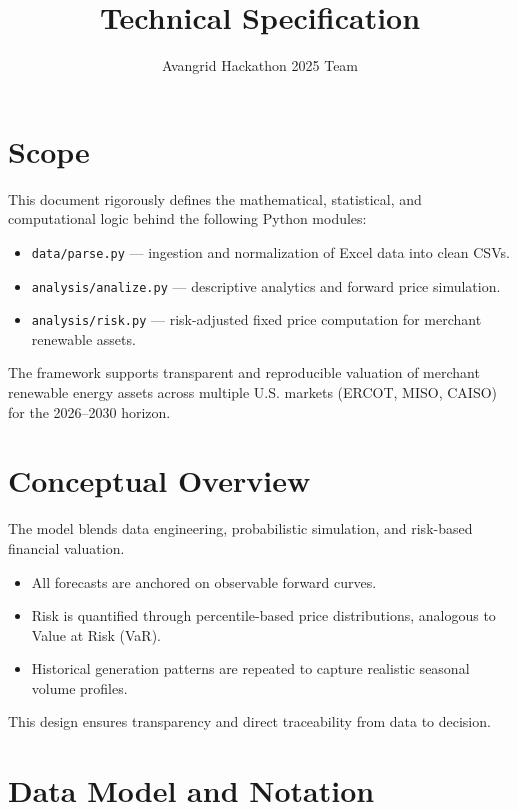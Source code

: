\documentclass[12pt]{article}
\title{Technical Specification}
\author{Avangrid Hackathon 2025 Team}
\date{}
\begin{document}
\maketitle

\tableofcontents
\newpage

\section{Scope}
This document rigorously defines the mathematical, statistical, and computational logic behind the following Python modules:

\begin{itemize}
    \item \texttt{data/parse.py} --- ingestion and normalization of Excel data into clean CSVs.
    \item \texttt{analysis/analize.py} --- descriptive analytics and forward price simulation.
    \item \texttt{analysis/risk.py} --- risk-adjusted fixed price computation for merchant renewable assets.
\end{itemize}

The framework supports transparent and reproducible valuation of merchant renewable energy assets across multiple U.S. markets (ERCOT, MISO, CAISO) for the 2026--2030 horizon.

\section{Conceptual Overview}
The model blends data engineering, probabilistic simulation, and risk-based financial valuation.

\begin{itemize}
    \item All forecasts are anchored on observable forward curves.
    \item Risk is quantified through percentile-based price distributions, analogous to Value at Risk (VaR).
    \item Historical generation patterns are repeated to capture realistic seasonal volume profiles.
\end{itemize}

This design ensures transparency and direct traceability from data to decision.

\section{Data Model and Notation}
\end{document}
